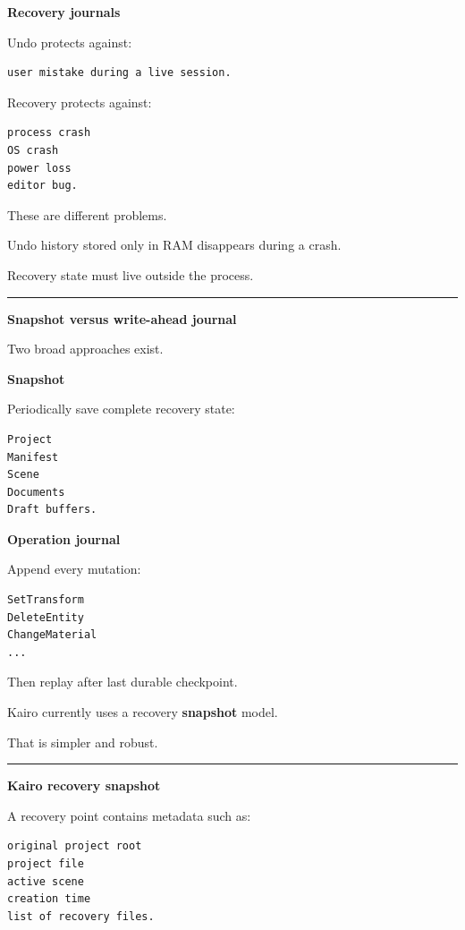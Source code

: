 \textbf{Recovery journals}

Undo protects against:

\begin{verbatim}
user mistake during a live session.
\end{verbatim}

Recovery protects against:

\begin{verbatim}
process crash
OS crash
power loss
editor bug.
\end{verbatim}

These are different problems.

Undo history stored only in RAM disappears during a crash.

Recovery state must live outside the process.

\begin{center}\rule{0.5\linewidth}{0.5pt}\end{center}

\textbf{Snapshot versus write-ahead journal}

Two broad approaches exist.

\textbf{Snapshot}

Periodically save complete recovery state:

\begin{verbatim}
Project
Manifest
Scene
Documents
Draft buffers.
\end{verbatim}

\textbf{Operation journal}

Append every mutation:

\begin{verbatim}
SetTransform
DeleteEntity
ChangeMaterial
...
\end{verbatim}

Then replay after last durable checkpoint.

Kairo currently uses a recovery \textbf{snapshot} model.

That is simpler and robust.

\begin{center}\rule{0.5\linewidth}{0.5pt}\end{center}

\textbf{Kairo recovery snapshot}

A recovery point contains metadata such as:

\begin{verbatim}
original project root
project file
active scene
creation time
list of recovery files.
\end{verbatim}

